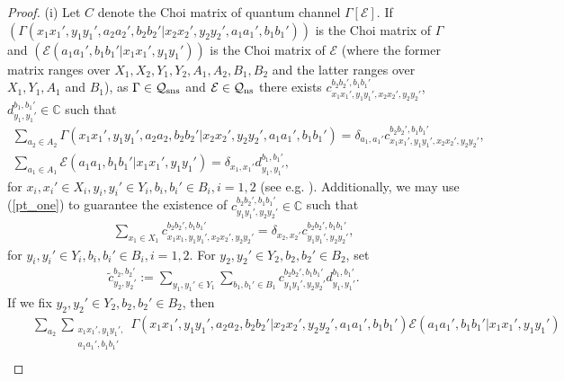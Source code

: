\documentclass[11pt]{amsart}
\newcommand{\cl}[1]{\mathcal{#1}}
\newcommand{\bb}[1]{\mathbb{#1}}
\begin{document}
\begin{proof}
(i) Let $C$ denote the Choi matrix of quantum channel $\Gamma[\cl{E}]$. If $(\Gamma(x_{1}x_{1}', y_{1}y_{1}', a_{2}a_{2}', b_{2}b_{2}'|x_{2}x_{2}', y_{2}y_{2}', a_{1}a_{1}', b_{1}b_{1}'))$ is the Choi matrix of $\Gamma$ and $(\cl{E}(a_{1}a_{1}', b_{1}b_{1}'|x_{1}x_{1}', y_{1}y_{1}'))$ is the Choi matrix of $\cl{E}$ (where the former matrix ranges over $X_{1}, X_{2}, Y_{1}, Y_{2}, A_{1}, A_{2}, B_{1}, B_{2}$ and the latter ranges over $X_{1}, Y_{1}, A_{1}$ and $B_{1}$), as $\Gamma \in \cl{Q}_{\rm sns}$ and $\cl{E} \in \cl{Q}_{\rm ns}$ there exists $c_{x_{1}x_{1}', y_{1}y_{1}', x_{2}x_{2}', y_{2}y_{2}'}^{b_{2}b_{2}', b_{1}b_{1}'}$, $d_{y_{1}, y_{1}'}^{b_{1}, b_{1}'} \in \bb{C}$ such that 
\begin{gather*}
	\sum\limits_{a_{2} \in A_{2}}\Gamma(x_{1}x_{1}', y_{1}y_{1}', a_{2}a_{2}, b_{2}b_{2}'|x_{2}x_{2}', y_{2}y_{2}', a_{1}a_{1}', b_{1}b_{1}') = \delta_{a_{1}, a_{1}'}c_{x_{1}x_{1}', y_{1}y_{1}', x_{2}x_{2}', y_{2}y_{2}'}^{b_{2}b_{2}', b_{1}b_{1}'},
\\	\sum\limits_{a_{1} \in A_{1}}\cl{E}(a_{1}a_{1}, b_{1}b_{1}'|x_{1}x_{1}', y_{1}y_{1}') = \delta_{x_{1}, x_{1}'}d_{y_{1}, y_{1}'}^{b_{1}, b_{1}'},
\end{gather*}
\noindent for $x_{i}, x_{i}' \in X_{i}, y_{i}, y_{i}' \in Y_{i}, b_{i}, b_{i}' \in B_{i}, i = 1, 2$ (see e.g. \cite{dw}). Additionally, we may use (\ref{pt_one}) to guarantee the existence of $c_{y_{1}y_{1}', y_{2}y_{2}'}^{b_{2}b_{2}', b_{1}b_{1}'} \in \bb{C}$ such that
\begin{gather*}
	\sum\limits_{x_{1} \in X_{1}}c_{x_{1}x_{1}, y_{1}y_{1}', x_{2}x_{2}', y_{2}y_{2}'}^{b_{2}b_{2}', b_{1}b_{1}'} = \delta_{x_{2}, x_{2}'}c_{y_{1}y_{1}', y_{2}y_{2}'}^{b_{2}b_{2}', b_{1}b_{1}'},
\end{gather*}
\noindent for $y_{i}, y_{i}' \in Y_{i}, b_{i}, b_{i}' \in B_{i}, i = 1, 2$. For $y_{2}, y_{2}' \in Y_{2}, b_{2}, b_{2}' \in B_{2}$, set
\begin{gather*}
	\tilde{c}_{y_{2}, y_{2}'}^{b_{2}, b_{2}'} := \sum\limits_{y_{1}, y_{1}' \in Y_{1}}\sum\limits_{b_{1}, b_{1}' \in B_{1}}c_{y_{1}y_{1}', y_{2}y_{2}'}^{b_{2}b_{2}', b_{1}b_{1}'}d_{y_{1}, y_{1}'}^{b_{1}, b_{1}'}.
\end{gather*}
\noindent If we fix $y_{2}, y_{2}' \in Y_{2}, b_{2}, b_{2}' \in B_{2}$, then
\begin{eqnarray*}
& &
	\sum\limits_{a_{2}}\sum\limits_{\substack{x_{1}x_{1}', y_{1}y_{1}', \\ a_{1}a_{1}', b_{1}b_{1}'}}\Gamma(x_{1}x_{1}', y_{1}y_{1}', a_{2}a_{2}, b_{2}b_{2}'|x_{2}x_{2}', y_{2}y_{2}', a_{1}a_{1}', b_{1}b_{1}')\cl{E}(a_{1}a_{1}', b_{1}b_{1}'|x_{1}x_{1}', y_{1}y_{1}') \\

\end{eqnarray*}
\end{proof}
\end{document}
